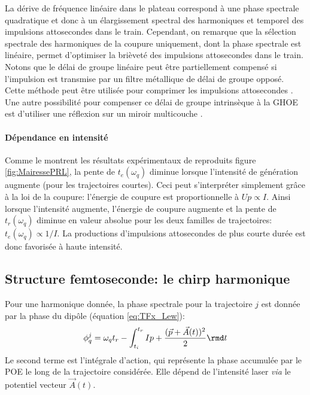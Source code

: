 La dérive de fréquence linéaire dans le plateau correspond à une phase spectrale quadratique et donc à un élargissement spectral des harmoniques et temporel des impulsions attosecondes dans le train. Cependant, on remarque que la sélection spectrale des harmoniques de la coupure uniquement, dont la phase spectrale est linéaire, permet d'optimiser la brièveté des impulsions attosecondes dans le train. Notons que le délai de groupe linéaire peut être partiellement compensé si l'impulsion est transmise par un filtre métallique de délai de groupe opposé. Cette méthode peut être utilisée pour comprimer les impulsions attosecondes . Une autre possibilité pour compenser ce délai de groupe intrinsèque à la GHOE est d'utiliser une réflexion sur un miroir multicouche .

\paragraph{Dépendance en intensité} Comme le montrent les résultats expérimentaux de  reproduits figure \ref{fig:MairessePRL}, la pente de $t_e (\omega_q)$ diminue lorsque l'intensité de génération augmente (pour les trajectoires courtes). Ceci peut s'interpréter simplement grâce à la loi de la coupure: l'énergie de coupure est proportionnelle à $Up \propto I$. Ainsi lorsque l'intensité augmente, l'énergie de coupure augmente et la pente de $t_r (\omega_q)$ diminue en valeur absolue pour les deux familles de trajectoires: $t_e (\omega_q) \propto 1/I $. La productions d'impulsions attosecondes de plus courte durée est donc favorisée à haute intensité.

\subsection{Structure femtoseconde: le chirp harmonique}
Pour une harmonique donnée, la phase spectrale pour la trajectoire $j$ est donnée par la phase du dipôle (équation \ref{eq:TFx_Lew}):
\begin{equation}
\phi_q^j = \omega_q t_r - \int_{t_i}^{t_r} Ip + \frac{(\vec{p} + \vec{A}(t))^2}{2} \rmd t
\label{eq:PhaseHarmonique}
\end{equation}
Le second terme est l'intégrale d'action, qui représente la phase accumulée par le POE le long de la trajectoire considérée. Elle dépend de l'intensité laser \textit{via} le potentiel vecteur $\vec{A}(t)$.

